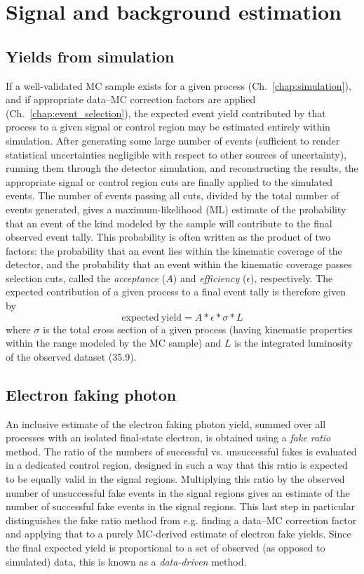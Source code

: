 \chapter{Signal and background estimation} \label{chap:background_estimation}
\section{Yields from simulation} \label{sec:background_estimation_simulated}
If a well-validated MC sample exists for a given process (Ch.~\ref{chap:simulation}), and if appropriate data--MC correction factors are applied (Ch.~\ref{chap:event_selection}),
the expected event yield contributed by that process to a given signal or control region may be estimated entirely within simulation.
After generating some large number of events (sufficient to render statistical uncertainties negligible with respect to other sources of uncertainty),
running them through the detector simulation, and reconstructing the results, the appropriate signal or control region cuts are finally applied to the simulated events.
The number of events passing all cuts, divided by the total number of events generated, gives a maximum-likelihood (ML) estimate of the probability that
an event of the kind modeled by the sample will contribute to the final observed event tally. This probability is often written as the product of two factors: the
probability that an event lies within the kinematic coverage of the detector, and the probability that an event within the kinematic coverage passes selection cuts,
called the \textit{acceptance} ($A$) and \textit{efficiency} ($\epsilon$), respectively. The expected contribution of a given process to a final event tally is therefore given by
\begin{equation}
\mathrm{expected\ yield} = A*\epsilon*\sigma*L
\end{equation}
where $\sigma$ is the total cross section of a given process (having kinematic properties within the range modeled by the MC sample) and $L$ is the integrated
luminosity of the observed dataset (35.9\fbinv).

\section{Electron faking photon} \label{sec:background_estimation_elefake}
An inclusive estimate of the electron faking photon yield, summed over all processes with an isolated final-state electron, is obtained using a \textit{fake ratio} method.
The ratio of the numbers of successful vs. unsuccessful fakes is evaluated in a dedicated control region, designed in such a way that this ratio is expected to be equally
valid in the signal regions. Multiplying this ratio by the observed number of unsuccessful fake events in the signal regions gives an estimate of the number of successful
fake events in the signal regions. This last step in particular distinguishes the fake ratio method from e.g. finding a data--MC correction factor and applying that to
a purely MC-derived estimate of electron fake yields. Since the final expected yield is proportional to a set of observed (as opposed to simulated) data,
this is known as a \textit{data-driven} method.


